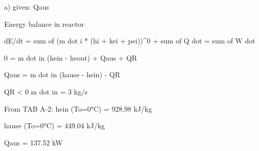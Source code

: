 a) given: Qaus

Energy balance in reactor

dE/dt = sum of (m dot i * (hi + kei + pei))^0 + sum of Q dot = sum of W dot

0 = m dot in (hein - heout) + Qaus + QR

Qaus = m dot in (hause - hein) - QR

QR < 0  m dot in = 3 kg/s

From TAB A-2: hein (To=0°C) = 928.98 kJ/kg

hause (To=0°C) = 449.04 kJ/kg

Qaus = 137.52 kW